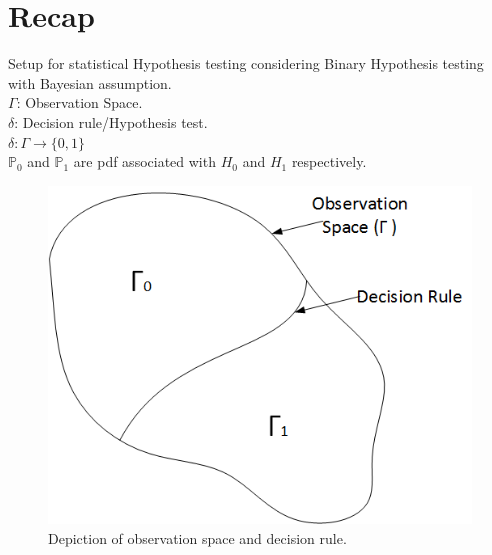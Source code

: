 \documentclass[12pt]{report}
\begin{document}
\maketitle

\section{Recap}
Setup for statistical Hypothesis testing considering Binary Hypothesis testing with Bayesian assumption.\\
 {$\Gamma$: Observation Space. }\\
{$\delta$: Decision rule/Hypothesis test.}\\ 
{$\delta: \Gamma \to \{0, 1\}$}\\
{$\mathbb{P}_0$ and $\mathbb{P}_1$  are pdf associated with $H_0$ and $H_1$ respectively.}\\

\begin{figure}[h]
\centering
\includegraphics[scale=0.5]{Figures/ObservationSpace}
\caption{Depiction of observation space and decision rule.}
\label{fig:obsspace}
\end{figure}
\end{document}
